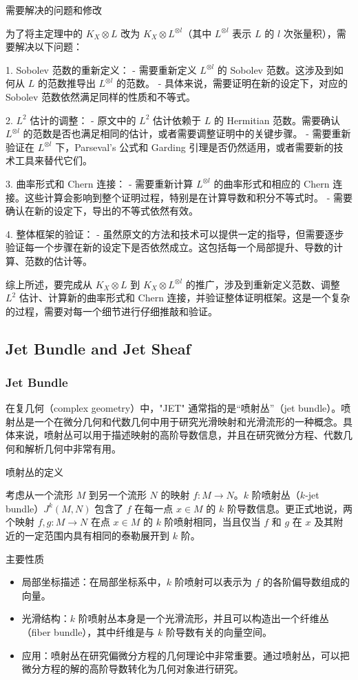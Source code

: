 \documentclass[lang=cn,12pt,fontset=none,a4paper]{beautybook}
\begin{document}
需要解决的问题和修改

为了将主定理中的 $K_X \otimes L$ 改为 $K_X \otimes L^{\otimes l}$（其中 $L^{\otimes l}$ 表示 $L$ 的 $l$ 次张量积），需要解决以下问题：

1. Sobolev 范数的重新定义：
   - 需要重新定义 $L^{\otimes l}$ 的 Sobolev 范数。这涉及到如何从 $L$ 的范数推导出 $L^{\otimes l}$ 的范数。
   - 具体来说，需要证明在新的设定下，对应的 Sobolev 范数依然满足同样的性质和不等式。

2. $L^2$ 估计的调整：
   - 原文中的 $L^2$ 估计依赖于 $L$ 的 Hermitian 范数。需要确认 $L^{\otimes l}$ 的范数是否也满足相同的估计，或者需要调整证明中的关键步骤。
   - 需要重新验证在 $L^{\otimes l}$ 下，Parseval's 公式和 Garding 引理是否仍然适用，或者需要新的技术工具来替代它们。

3. 曲率形式和 Chern 连接：
   - 需要重新计算 $L^{\otimes l}$ 的曲率形式和相应的 Chern 连接。这些计算会影响到整个证明过程，特别是在计算导数和积分不等式时。
   - 需要确认在新的设定下，导出的不等式依然有效。

4. 整体框架的验证：
   - 虽然原文的方法和技术可以提供一定的指导，但需要逐步验证每一个步骤在新的设定下是否依然成立。这包括每一个局部提升、导数的计算、范数的估计等。

综上所述，要完成从 $K_X \otimes L$ 到 $K_X \otimes L^{\otimes l}$ 的推广，涉及到重新定义范数、调整 $L^2$ 估计、计算新的曲率形式和 Chern 连接，并验证整体证明框架。这是一个复杂的过程，需要对每一个细节进行仔细推敲和验证。

\subsection{Jet Bundle and Jet Sheaf}
\subsubsection*{Jet Bundle}
在复几何（complex geometry）中，"JET" 通常指的是“喷射丛”（jet bundle）。喷射丛是一个在微分几何和代数几何中用于研究光滑映射和光滑流形的一种概念。具体来说，喷射丛可以用于描述映射的高阶导数信息，并且在研究微分方程、代数几何和解析几何中非常有用。

喷射丛的定义

考虑从一个流形 $M$ 到另一个流形 $N$ 的映射 $f: M \to N$。$k$ 阶喷射丛（$k$-jet bundle）$J^k(M, N)$ 包含了 $f$ 在每一点 $x \in M$ 的 $k$ 阶导数信息。更正式地说，两个映射 $f, g: M \to N$ 在点 $x \in M$ 的 $k$ 阶喷射相同，当且仅当 $f$ 和 $g$ 在 $x$ 及其附近的一定范围内具有相同的泰勒展开到 $k$ 阶。

主要性质
\begin{itemize}
   \item 局部坐标描述：在局部坐标系中，$k$ 阶喷射可以表示为 $f$ 的各阶偏导数组成的向量。
   \item 光滑结构：$k$ 阶喷射丛本身是一个光滑流形，并且可以构造出一个纤维丛（fiber bundle），其中纤维是与 $k$ 阶导数有关的向量空间。
   \item 应用：喷射丛在研究偏微分方程的几何理论中非常重要。通过喷射丛，可以把微分方程的解的高阶导数转化为几何对象进行研究。
\end{itemize}
\end{document}
